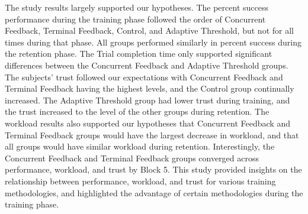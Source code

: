 The study results largely supported our hypotheses.
The percent success performance during the training phase followed the order of Concurrent Feedback, Terminal Feedback, Control, and Adaptive Threshold, but not for all times during that phase.
All groups performed similarly in percent success during the retention phase.
The Trial completion time only supported significant differences between the Concurrent Feedback and Adaptive Threshold groups.
The subjects' trust followed our expectations with Concurrent Feedback and Terminal Feedback having the highest levels, and the Control group continually increased.
The Adaptive Threshold group had lower trust during training, and the trust increased to the level of the other groups during retention.
The workload results also supported our hypotheses that Concurrent Feedback and Terminal Feedback groups would have the largest decrease in workload, and that all groups would have similar workload during retention.
Interestingly, the Concurrent Feedback and Terminal Feedback groups converged across performance, workload, and trust by Block 5.
This study provided insights on the relationship between performance, workload, and trust for various training methodologies, and highlighted the advantage of certain methodologies during the training phase.

